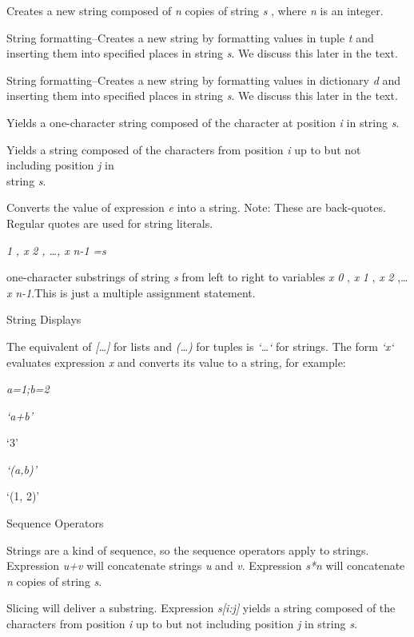 Creates a new string composed of
\emph{n} copies of string \emph{s} , where \emph{n} is an integer.



String formatting--Creates a new
string by formatting values in tuple \emph{t} and inserting them into
specified places in string \emph{s}. We discuss this later in the text.



String formatting--Creates a new
string by formatting values in dictionary \emph{d} and inserting them
into specified places in string \emph{s}. We discuss this later in the
text.



Yields a one-character string
composed of the character at position \emph{i} in string \emph{s}.



Yields a string composed of the
characters from position \emph{i} up to but not including position
\emph{j} in\\
string \emph{s}.



Converts the value of expression
\emph{e} into a string. Note: These are back-quotes. Regular quotes are
used for string literals.


\emph{1} \emph{, x} \emph{2} \emph{, \ldots{}, x} \emph{n-1} \emph{=s}

 one-character
substrings of string \emph{s} from left to right to variables \emph{x}
\emph{0} , \emph{x} \emph{1} , \emph{x} \emph{2} ,\ldots{} \emph{x}
\emph{n-1}.This is just a multiple assignment statement.

String Displays

The equivalent of
\emph{{[}\ldots{}{]}} for lists and \emph{(\ldots{})} for tuples is
\emph{`\ldots{}`} for strings. The form \emph{`x`} evaluates expression
\emph{x} and converts its value to a string, for example:


\emph{a=1;b=2}


\emph{`a+b'}

`3'


\emph{`(a,b)'}

`(1, 2)'

Sequence Operators

Strings are a kind of sequence, so
the sequence operators apply to strings. Expression \emph{u+v} will
concatenate strings \emph{u} and \emph{v}. Expression \emph{s*n} will
concatenate \emph{n} copies of string \emph{s}.

Slicing will deliver a substring.
Expression \emph{s{[}i:j{]}} yields a string composed of the characters
from position \emph{i} up to but not including position \emph{j} in
string \emph{s}.

